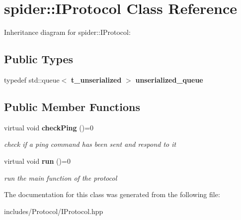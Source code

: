 \section{spider\+:\+:I\+Protocol Class Reference}
\label{classspider_1_1_i_protocol}


Inheritance diagram for spider\+:\+:I\+Protocol\+:
\subsection*{Public Types}
\begin{DoxyCompactItemize}
\item 
\mbox{\label{classspider_1_1_i_protocol_a00109c5b9f606e7ab25554df6d6aa863}} 
typedef std\+::queue$<$ \textbf{ t\+\_\+unserialized} $>$ {\bfseries unserialized\+\_\+queue}
\end{DoxyCompactItemize}
\subsection*{Public Member Functions}
\begin{DoxyCompactItemize}
\item 
\mbox{\label{classspider_1_1_i_protocol_a2b557c3df845ff6a4637a718b4339cce}} 
virtual void \textbf{ check\+Ping} ()=0
\begin{DoxyCompactList}\small\item\em check if a ping command has been sent and respond to it \end{DoxyCompactList}\item 
\mbox{\label{classspider_1_1_i_protocol_a7e204667784b17476fe66364d317c623}} 
virtual void \textbf{ run} ()=0
\begin{DoxyCompactList}\small\item\em run the main function of the protocol \end{DoxyCompactList}\end{DoxyCompactItemize}


The documentation for this class was generated from the following file\+:\begin{DoxyCompactItemize}
\item 
includes/\+Protocol/I\+Protocol.\+hpp\end{DoxyCompactItemize}
